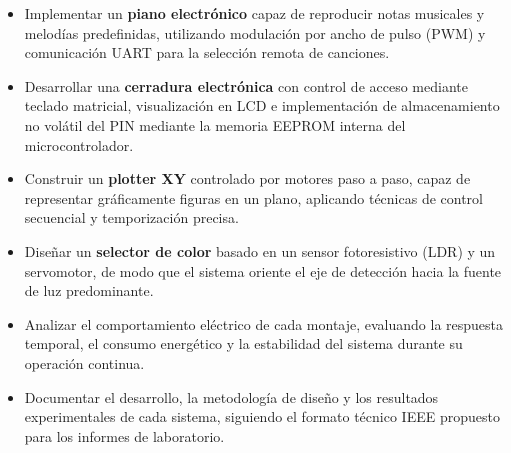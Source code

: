 \begin{itemize}
    \item Implementar un \textbf{piano electrónico} capaz de reproducir notas musicales y melodías predefinidas, 
    utilizando modulación por ancho de pulso (PWM) y comunicación UART para la selección remota de canciones.
    
    \item Desarrollar una \textbf{cerradura electrónica} con control de acceso mediante teclado matricial, 
    visualización en LCD e implementación de almacenamiento no volátil del PIN mediante la memoria EEPROM interna del microcontrolador.
    
    \item Construir un \textbf{plotter XY} controlado por motores paso a paso, 
    capaz de representar gráficamente figuras en un plano, 
    aplicando técnicas de control secuencial y temporización precisa.
    
    \item Diseñar un \textbf{selector de color} basado en un sensor fotoresistivo (LDR) 
    y un servomotor, de modo que el sistema oriente el eje de detección hacia la fuente de luz predominante.
    
    \item Analizar el comportamiento eléctrico de cada montaje, 
    evaluando la respuesta temporal, el consumo energético y la estabilidad del sistema durante su operación continua.
    
    \item Documentar el desarrollo, la metodología de diseño y los resultados experimentales de cada sistema, 
    siguiendo el formato técnico IEEE propuesto para los informes de laboratorio.
\end{itemize}

